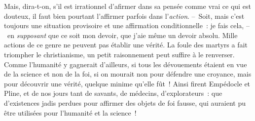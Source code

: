 \documentclass[french,twoside]{book} %
\begin{document}
Mais, dira-t-on, s’il est irrationnel d’afirmer dans sa pensée comme vrai ce qui est douteux, il faut bien pourtant l’affirmer parfois dans l’\emph{action}. – Soit, mais c’est toujours une situation provisoire et une affirmation conditionnelle : je fais cela, – en \emph{supposant} que ce soit mon devoir, que j’aie même un devoir absolu. Mille actions de ce genre ne peuvent pas établir une vérité. La foule des martyrs a fait triompher le christianisme, un petit raisonnement peut suffire à le renverser. Comme l’humanité y gagnerait d’ailleurs, si tous les dévouements étaient en vue de la science et non de la foi, si on mourait non pour défendre une croyance, mais pour découvrir une vérité, quelque minime qu’elle fût ! Ainsi firent Empédocle et Pline, et de nos jours tant de savants, de médecins, d’explorateurs : que d’existences jadis perdues pour affirmer des objets de foi fausse, qui auraient pu être utilisées pour l’humanité et la science !
\end{document}

